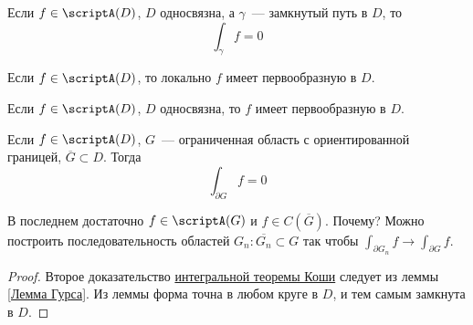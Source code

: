 \documentclass{article}
\begin{document}
    \begin{corollary}
        Если $f\in\scriptA(D)$, $D$ односвязна, а $\gamma$~--- замкнутый путь в $D$, то
        $$
        \int_{\gamma}f=0
        $$
    \end{corollary}
    \begin{corollary}
        Если $f\in\scriptA(D)$, то локально $f$ имеет первообразную в $D$.
    \end{corollary}
    \begin{corollary}
        Если $f\in\scriptA(D)$, $D$ односвязна, то $f$ имеет первообразную в $D$.
    \end{corollary}
    \begin{corollary}
        Если $f\in\scriptA(D)$, $G$~--- ограниченная область с ориентированной границей, $\overline G\subset D$. Тогда
        $$
        \int_{\partial G}f=0
        $$
    \end{corollary}
    \begin{remark}
        В последнем достаточно $f\in\scriptA(G)$ и $f\in C(\overline G)$. Почему? Можно построить последовательность областей $G_n:\overline{G_n}\subset G$ так чтобы $\int_{\partial G_n}f\to\int_{\partial G}f$.
    \end{remark}
    \begin{proof}
        Второе доказательство \hyperref[Интегральная теорема Коши]{интегральной теоремы Коши} следует из леммы \ref{Лемма Гурса}. Из леммы форма точна в любом круге в $D$, и тем самым замкнута в $D$.
    \end{proof}
\end{document}

